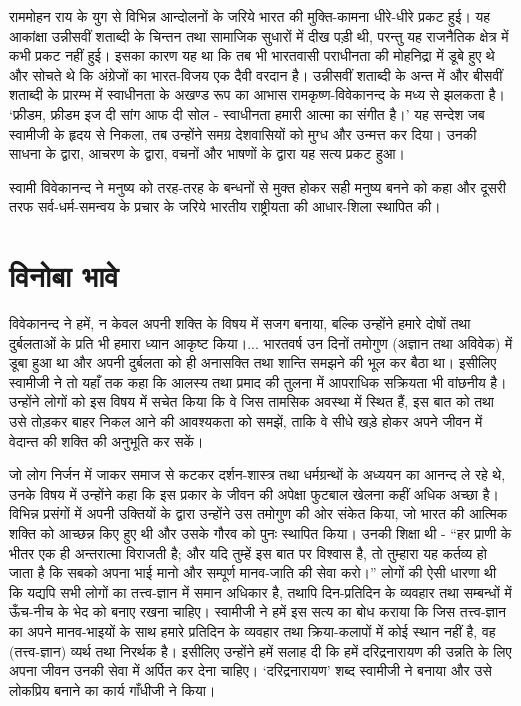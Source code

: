 राममोहन राय के युग से विभिन्न आन्दोलनों के जरिये भारत की मुक्ति-कामना धीरे-धीरे प्रकट हुई। यह आकांक्षा उन्नीसवीं शताब्दी के चिन्तन तथा सामाजिक सुधारों में दीख पड़ी थी, परन्तु यह राजनैतिक क्षेत्र में कभी प्रकट नहीं हुई। इसका कारण यह था कि तब भी भारतवासी पराधीनता की मोहनिद्रा में डूबे हुए थे और सोचते थे कि अंग्रेजों का भारत-विजय एक दैवी वरदान है। उन्नीसवीं शताब्दी के अन्त में और बीसवीं शताब्दी के प्रारम्भ में स्वाधीनता के अखण्ड रूप का आभास रामकृष्ण-विवेकानन्द के मध्य से झलकता है। ‘फ्रीडम, फ्रीडम इज दी सांग आफ दी सोल - स्वाधीनता हमारी आत्मा का संगीत है।’ यह सन्देश जब स्वामीजी के हृदय से निकला, तब उन्होंने समग्र देशवासियों को मुग्ध और उन्मत्त कर दिया। उनकी साधना के द्वारा, आचरण के द्वारा, वचनों और भाषणों के द्वारा यह सत्य प्रकट हुआ। 

\vskip 2pt

स्वामी विवेकानन्द ने मनुष्य को तरह-तरह के बन्धनों से मुक्त होकर सही मनुष्य बनने को कहा और दूसरी तरफ सर्व-धर्म-समन्वय के प्रचार के जरिये भारतीय राष्ट्रीयता की आधार-शिला स्थापित की।


\section*{विनोबा भावे}


विवेकानन्द ने हमें, न केवल अपनी शक्ति के विषय में सजग बनाया, बल्कि उन्होंने हमारे दोषों तथा दुर्बलताओं के प्रति भी हमारा ध्यान आकृष्ट किया।... भारतवर्ष उन दिनों तमोगुण (अज्ञान तथा अविवेक) में डूबा हुआ था और अपनी दुर्बलता को ही अनासक्ति तथा शान्ति समझने की भूल कर बैठा था। इसीलिए स्वामीजी ने तो यहाँ तक कहा कि आलस्य तथा प्रमाद की तुलना में आपराधिक सक्रियता भी वांछनीय है। उन्होंने लोगों को इस विषय में सचेत किया कि वे जिस तामसिक अवस्था में स्थित हैं, इस बात को तथा उसे तोड़कर बाहर निकल आने की आवश्यकता को समझें, ताकि वे सीधे खड़े होकर अपने जीवन में वेदान्त की शक्ति की अनुभूति कर सकें। 

\vskip 2pt

जो लोग निर्जन में जाकर समाज से कटकर दर्शन-शास्त्र तथा धर्मग्रन्थों के अध्ययन का आनन्द ले रहे थे, उनके विषय में उन्होंने कहा कि इस प्रकार के जीवन की अपेक्षा फुटबाल खेलना कहीं अधिक अच्छा है। विभिन्न प्रसंगों में अपनी उक्तियों के द्वारा उन्होंने उस तमोगुण की ओर संकेत किया, जो भारत की आत्मिक शक्ति को आच्छन्न किए हुए थी और उसके गौरव को पुनः स्थापित किया। उनकी शिक्षा थी - “हर प्राणी के भीतर एक ही अन्तरात्मा विराजती है; और यदि तुम्हें इस बात पर विश्वास है, तो तुम्हारा यह कर्तव्य हो जाता है कि सबको अपना भाई मानो और सम्पूर्ण मानव-जाति की सेवा करो।” लोगों की ऐसी धारणा थी कि यद्यपि सभी लोगों का तत्त्व-ज्ञान में समान अधिकार है, तथापि दिन-प्रतिदिन के व्यवहार तथा सम्बन्धों में ऊँच-नीच के भेद को बनाए रखना चाहिए। स्वामीजी ने हमें इस सत्य का बोध कराया कि जिस तत्त्व-ज्ञान का अपने मानव-भाइयों के साथ हमारे प्रतिदिन के व्यवहार तथा क्रिया-कलापों में कोई स्थान नहीं है, वह (तत्त्व-ज्ञान) व्यर्थ तथा निरर्थक है। इसीलिए उन्होंने हमें सलाह दी कि हमें दरिद्रनारायण की उन्नति के लिए अपना जीवन उनकी सेवा में अर्पित कर देना चाहिए। ‘दरिद्रनारायण’ शब्द स्वामीजी ने बनाया और उसे लोकप्रिय बनाने का कार्य गाँधीजी ने किया।



